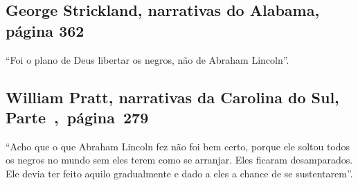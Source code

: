 \subsection{George Strickland, narrativas do Alabama, página 362}
\label{ref257} 

``Foi o plano de Deus libertar os negros, não de Abraham Lincoln''.

\subsection{William Pratt, narrativas da Carolina do Sul, Parte~,~página~279}
\label{ref213}

``Acho que o que Abraham Lincoln fez não foi bem certo, porque ele
soltou todos os negros no mundo sem eles terem como se arranjar. Eles
ficaram desamparados. Ele devia ter feito aquilo gradualmente e dado a
eles a chance de se sustentarem''.
